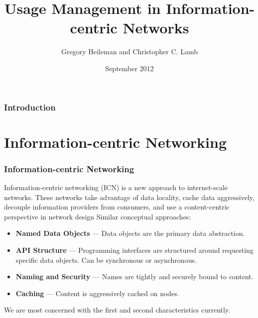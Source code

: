 \documentclass[t,handout, 10pt]{beamer}
\title{Usage Management in Information-centric Networks}
\author [Greg, Chris]{Gregory Heileman and Christopher C. Lamb}
\institute[University of New Mexico]{
\inst {}Department of Electrical and Computer Engineering\\
University of New Mexico}
\date{September 2012}
\begin{document}
\begin{frame}
\titlepage
\end{frame}


\begin{frame}
\frametitle{Introduction}
\tableofcontents 
\end{frame}

\section{Information-centric Networking}
\begin{frame}
\frametitle{Information-centric Networking}

Information-centric networking (ICN) is a new approach to internet-scale networks.  These networks take advantage of data locality, cache data aggressively, decouple information providers from consumers, and use a content-centric perspective in network design
\pause
\newline
\newline
Similar conceptual approaches:
{\small
\begin{itemize}
\item {\bf Named Data Objects} --- Data objects are the primary data abstraction.
\item {\bf API Structure} --- Programming interfaces are structured around requesting specific data objects.  Can be synchronous or asynchronous.
\item {\bf Naming and Security} --- Names are tightly and securely bound to content.
\item {\bf Caching} --- Content is aggressively cached on nodes.
\end{itemize}
}
\pause
We are most concerned with the first and second characteristics currently.
\end{frame}
\end{document}
